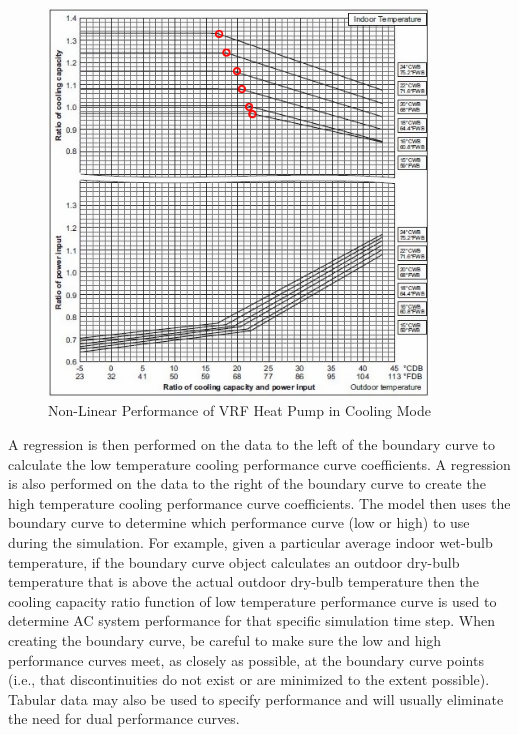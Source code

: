 \begin{figure}[hbtp] %
\centering
\includegraphics[width=0.9\textwidth, height=0.9\textheight, keepaspectratio=true]{media/image5340.png}
\caption{Non-Linear Performance of VRF Heat Pump in Cooling Mode \label{fig:non-linear-performance-of-vrf-heat-pump-in-cooling-mode}}
\end{figure}

A regression is then performed on the data to the left of the boundary curve to calculate the low temperature cooling performance curve coefficients. A regression is also performed on the data to the right of the boundary curve to create the high temperature cooling performance curve coefficients. The model then uses the boundary curve to determine which performance curve (low or high) to use during the simulation. For example, given a particular average indoor wet-bulb temperature, if the boundary curve object calculates an outdoor dry-bulb temperature that is above the actual outdoor dry-bulb temperature then the cooling capacity ratio function of low temperature performance curve is used to determine AC system performance for that specific simulation time step. When creating the boundary curve, be careful to make sure the low and high performance curves meet, as closely as possible, at the boundary curve points (i.e., that discontinuities do not exist or are minimized to the extent possible). Tabular data may also be used to specify performance and will usually eliminate the need for dual performance curves.

